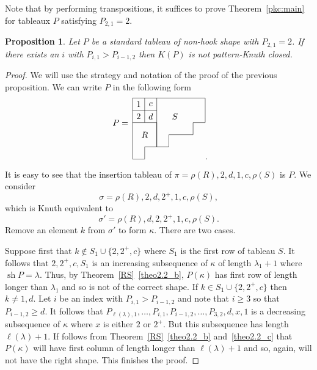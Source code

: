 \documentclass[10pt]{amsart}
\newtheorem{prop}[theo]{Proposition}
\newcommand{\ka}{\kappa}
\newcommand{\la}{\lambda}
\newcommand{\si}{\sigma}
\DeclareMathOperator{\sh}{sh}
\begin{document}
Note that by performing transpositions, it suffices to prove Theorem~\ref{pkc:main} for tableaux $P$ satisfying $P_{2,1}=2$.

\begin{prop}
Let $P$ be a standard tableau of non-hook shape with $P_{2,1}=2$. If there exists an $i$ with $P_{i,1}>P_{i-1,2}$ then $K(P)$ is not pattern-Knuth closed.
\end{prop}
\begin{proof}
We will use the strategy and notation of the proof of the previous proposition. We can write $P$ in the following form
\[
\begin{tikzpicture}[scale=.5]
\node at (-1,-2) {$P=$};
\draw (0,0) to (6,0) to (6,-2) to (5,-2) to (5,-3) to (3,-3) to (3,-4) to (2,-4) to (2,0);
\draw (0,-1) to (2,-1);
\draw (1,0) to (1,-2);
\draw (0,0) to (0,-5) to (1,-5) to (1,-4) to (2,-4) to (2,-2) to (0,-2);
\node at (.5,-.5) {$1$};
\node at (.5,-1.5) {$2$};
\node at (1.5,-.5) {$c$};
\node at (1.5,-1.5) {$d$};
\node at (1,-3) {$R$};
\node at (3.5,-1.5) {$S$};
\end{tikzpicture}.
\]
It is easy to see that the insertion tableau of $\pi= \rho(R), 2, d, 1, c, \rho(S)$ is $P$. We consider
\[
\si = \rho(R), 2, d, 2^+, 1, c, \rho(S),
\]
which is Knuth equivalent to
\[
\si' = \rho(R), d, 2, 2^+, 1, c, \rho(S).
\]
Remove an element $k$ from $\si'$ to form $\ka$. There are two cases.

Suppose first that $k\not\in S_1 \cup \{2,2^+,c\}$ where $S_1$ is the first row of tableau $S$. It follows that $2, 2^+, c, S_1$ is an increasing subsequence of $\ka$ of length $\la_1+1$ where $\sh P = \la$. Thus, by Theorem~\ref{RS}~\eqref{theo2.2_b}, $P(\ka)$ has first row of length longer than $\la_1$ and so is not of the correct shape. If $k\in S_1 \cup \{2,2^+,c\}$ then $k\neq 1,d$. Let $i$ be an index with $P_{i,1}>P_{i-1,2}$ and note that $i\ge3$ so that $P_{i-1,2}\ge d$. 
It follows that $P_{\ell(\la),1}, \dots, P_{i,1}, P_{i-1,2}, \dots, P_{3,2}, d, x, 1$ is a decreasing subsequence of $\ka$ where $x$ is either $2$ or $2^+$. But this subsequence has length $\ell(\la)+1$. If follows from Theorem~\ref{RS}~\eqref{theo2.2_b} and~\eqref{theo2.2_c} that $P(\ka)$ will have first column of length longer than $\ell(\la)+1$ and so, again, will not have the right shape. This finishes the proof.
\end{proof}
\end{document}
